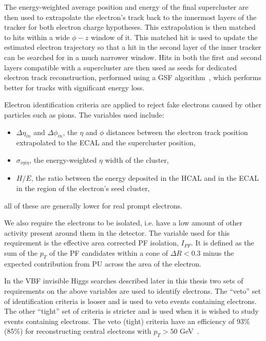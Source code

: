 The energy-weighted average position and energy of the final supercluster are then used to extrapolate the electron's track back to the innermost layers of the tracker for both electron charge hypotheses. This extrapolation is then matched to hits within a wide $\phi - z$ window of it. This matched hit is used to update the estimated electron trajectory so that a hit in the second layer of the inner tracker can be searched for in a much narrower window. Hits in both the first and second layers compatible with a supercluster are then used as seeds for dedicated electron track reconstruction, performed using a \ac{GSF} algorithm~\cite{GSFalgorithm}, which performs better for tracks with significant energy loss.

Electron identification criteria are applied to reject fake electrons caused by other particles such as pions. The variables used include:
\begin{itemize}
\item $\Delta\eta_{in}$ and $\Delta\phi_{in}$, the $\eta$ and $\phi$ distances between the electron track position extrapolated to the \ac{ECAL} and the supercluster position,
\item $\sigma_{i\eta i\eta}$, the energy-weighted $\eta$ width of the cluster,
\item $H/E$, the ratio between the energy deposited in the \ac{HCAL} and in the \ac{ECAL} in the region of the electron's seed cluster,
\end{itemize}
all of these are generally lower for real prompt electrons.

We also require the electrons to be isolated, i.e. have a low amount of other activity present around them in the detector. The variable used for this requirement is the effective area corrected \ac{PF} isolation, $I_{PF}$. It is defined as the sum of the $p_{T}$ of the \ac{PF} candidates within a cone of $\Delta R<0.3$ minus the expected contribution from \ac{PU} across the area of the electron.

In the \ac{VBF} invisible Higgs searches described later in this thesis two sets of requirements on the above variables are used to identify electrons. The ``veto'' set of identification criteria is looser and is used to veto events containing electrons. The other ``tight'' set of criteria is stricter and is used when it is wished to study events containing electrons. The veto (tight) criteria have an efficiency of 93\% (85\%) for reconstructing central electrons with $p_{T}>50$ GeV~\cite{eleeff}.

